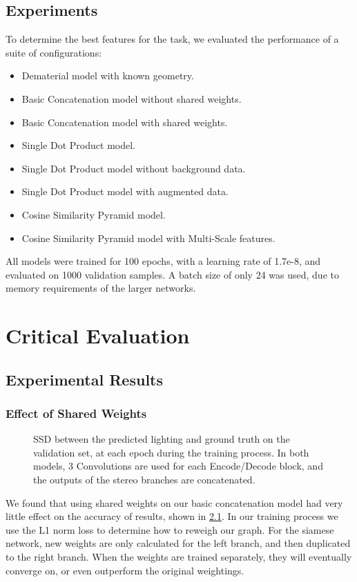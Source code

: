 \documentclass[ %
                    author={Gavin Parker},
                supervisor={Dr. Neill Campbell},
                    degree={MEng},
                     title={Deep Learning for Illumination Estimation from Stereo Images},
                  subtitle={},
                      type={Research},
                      year={2018} ]{dissertation}
\begin{document}
\section{Experiments}
To determine the best features for the task, we evaluated the performance of a suite of configurations:
\begin{itemize}
\item Dematerial model with known geometry.
\item Basic Concatenation model without shared weights.
\item Basic Concatenation model with shared weights.
\item Single Dot Product model.
\item Single Dot Product model without background data.
\item Single Dot Product model with augmented data.
\item Cosine Similarity Pyramid model.
\item Cosine Similarity Pyramid model with Multi-Scale features.
\end{itemize}
All models were trained for 100 epochs, with a learning rate of 1.7e-8, and evaluated on 1000 validation samples. A batch size of only 24 was used, due to memory requirements of the larger networks.
\chapter{Critical Evaluation}
\label{chap:evaluation}
\section{Experimental Results}
\subsection{Effect of Shared Weights}
\begin{figure}[H]
\newlength\figureheight
\newlength\figurewidth
\setlength\figureheight{6cm}
\setlength\figurewidth{12cm}
\centering

\caption{SSD between the predicted lighting and ground truth on the validation set, at each epoch during the training process. In both models, 3 Convolutions are used for each Encode/Decode block, and the outputs of the stereo branches are concatenated.}
\label{fig:siam_comp}

\end{figure}
We found that using shared weights on our basic concatenation model had very little effect on the accuracy of results, shown in \ref{fig:siam_comp}. In our training process we use the L1 norm loss to determine how to reweigh our graph. For the siamese network, new weights are only calculated for the left branch, and then duplicated to the right branch. When the weights are trained separately, they will eventually converge on, or even outperform the original weightings.
\end{document}
